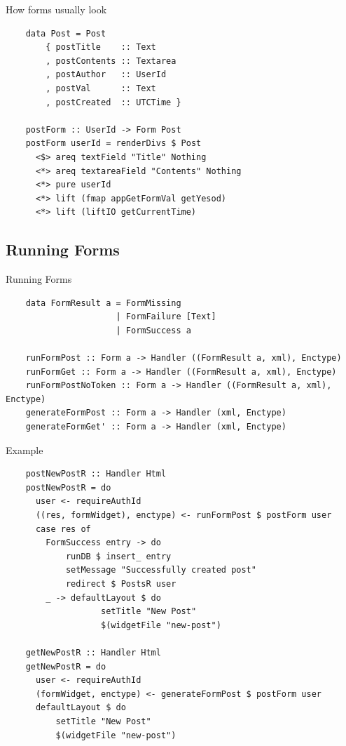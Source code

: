 \documentclass[pdf]{beamer}
\begin{document}
\begin{frame}[fragile]{How forms usually look}
  \begin{verbatim}
    data Post = Post
        { postTitle    :: Text
        , postContents :: Textarea
        , postAuthor   :: UserId
        , postVal      :: Text
        , postCreated  :: UTCTime }

    postForm :: UserId -> Form Post
    postForm userId = renderDivs $ Post
      <$> areq textField "Title" Nothing
      <*> areq textareaField "Contents" Nothing
      <*> pure userId
      <*> lift (fmap appGetFormVal getYesod)
      <*> lift (liftIO getCurrentTime)
  \end{verbatim}
\end{frame}

\subsection{Running Forms}
\begin{frame}[fragile]{Running Forms}
  \begin{verbatim}
    data FormResult a = FormMissing
                      | FormFailure [Text]
                      | FormSuccess a
    
    runFormPost :: Form a -> Handler ((FormResult a, xml), Enctype)
    runFormGet :: Form a -> Handler ((FormResult a, xml), Enctype)
    runFormPostNoToken :: Form a -> Handler ((FormResult a, xml), Enctype)
    generateFormPost :: Form a -> Handler (xml, Enctype)
    generateFormGet' :: Form a -> Handler (xml, Enctype)
  \end{verbatim}
\end{frame}

\begin{frame}[fragile]{Example}
  \begin{verbatim}
    postNewPostR :: Handler Html
    postNewPostR = do
      user <- requireAuthId
      ((res, formWidget), enctype) <- runFormPost $ postForm user
      case res of
        FormSuccess entry -> do
            runDB $ insert_ entry
            setMessage "Successfully created post"
            redirect $ PostsR user
        _ -> defaultLayout $ do
                   setTitle "New Post"
                   $(widgetFile "new-post")

    getNewPostR :: Handler Html
    getNewPostR = do
      user <- requireAuthId
      (formWidget, enctype) <- generateFormPost $ postForm user
      defaultLayout $ do
          setTitle "New Post"
          $(widgetFile "new-post")      
  \end{verbatim}
\end{frame}
\end{document}
